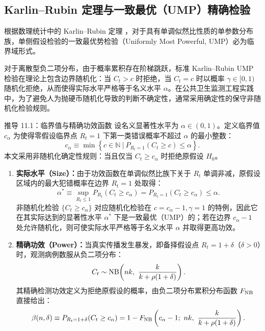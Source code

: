 \subsection{Karlin--Rubin 定理与一致最优（UMP）精确检验}

根据数理统计中的 Karlin--Rubin 定理 \citep{karlin1956theory, lehmann2005testing}，对于具有单调似然比性质的单参数分布族，单侧假设检验的一致最优势检验（Uniformly Most Powerful, UMP）必为临界域形式。

对于离散型负二项分布，由于概率累积存在阶梯跳跃，标准 Karlin--Rubin UMP 检验在理论上包含边界随机化：当 $C_t > c$ 时拒绝，当 $C_t = c$ 时以概率 $\gamma \in [0, 1)$ 随机化拒绝，从而使得实际水平严格等于名义水平 $\alpha$。在公共卫生监测工程实践中，为了避免人为抛硬币随机化导致的判断不确定性，通常采用确定性的保守非随机化检验规则。

\begin{derivationbox}{推导 11.1：临界值与精确功效函数}
设名义显著性水平为 $\alpha \in (0, 1)$。定义临界值 $c_\alpha$ 为使得零假设临界点 $R_t = 1$ 下第一类错误概率不超过 $\alpha$ 的最小整数：
\begin{equation}
  c_\alpha \equiv \min \left\{ c \in \mathbb{N} \ \Big|\ P_{R_t = 1}(C_t \ge c) \le \alpha \right\}.
\end{equation}
本文采用非随机化确定性规则：当且仅当 $C_t \ge c_\alpha$ 时拒绝原假设 $H_0$。
\begin{enumerate}
  \item \textbf{实际水平（Size）：}由于功效函数在单调似然比族下关于 $R_t$ 单调非减，原假设区域内的最大犯错概率在边界 $R_t = 1$ 处取得：
  \begin{equation}
    \alpha^* \equiv \sup_{R_t \le 1} P_{R_t}(C_t \ge c_\alpha) = P_{R_t = 1}(C_t \ge c_\alpha) \le \alpha.
  \end{equation}
  非随机化检验 $\{C_t \ge c_\alpha\}$ 对应随机化检验在 $c = c_\alpha - 1, \gamma = 1$ 的特例，因此它在其实际达到的显著性水平 $\alpha^*$ 下是一致最优（UMP）的；若在边界 $c_\alpha - 1$ 处允许随机化，则可使实际水平严格等于名义水平 $\alpha$ 并取得更高功效。
  \item \textbf{精确功效（Power）：}当真实传播发生暴发，即备择假设点 $R_t = 1 + \delta$（$\delta > 0$）时，观测病例数服从负二项分布：
  \begin{equation}
    C_t \sim \mathrm{NB}\!\left(nk,\ \frac{k}{k + \rho(1+\delta)}\right).
  \end{equation}
  其精确检测功效定义为拒绝原假设的概率，由负二项分布累积分布函数 $F_{\mathrm{NB}}$ 直接给出：
  \begin{equation}
    \beta(n, \delta) \equiv P_{R_t = 1+\delta}(C_t \ge c_\alpha) = 1 - F_{\mathrm{NB}}\left( c_\alpha - 1;\ nk,\ \frac{k}{k + \rho(1+\delta)} \right).
    \label{eq:exact-power-proof}
  \end{equation}
\end{enumerate}
\end{derivationbox}


